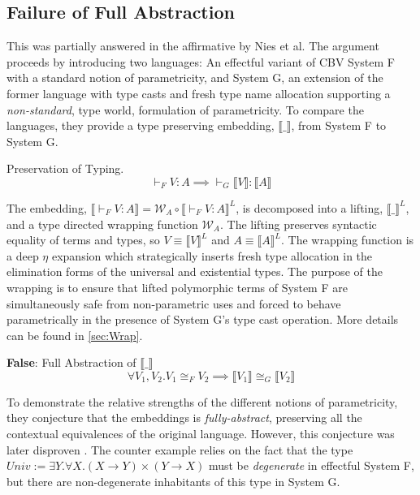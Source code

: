 \documentclass[acmsmall]{acmart}
\newcommand{\den}[1]{\llbracket #1\rrbracket}
\begin{document}
\subsection{Failure of Full Abstraction}
This was partially answered in the affirmative by Nies et al\cite{NonParam}. The argument proceeds by introducing two languages: An effectful variant of CBV System F with a standard notion of parametricity, and System G, an extension of the former language with type casts and fresh type name allocation supporting a \textit{non-standard}, type world, formulation of parametricity.
To compare the languages, they provide a type preserving embedding, $\den{\_}$, from System F to System G. 

\begin{theorem}
  Preservation of Typing.
  $$\vdash_F V : A \implies \vdash_G \den{V} : \den{A}$$
\end{theorem}

The embedding, $\den{\vdash_F V:A} = \mathcal{W}_{A} \circ \den{\vdash_F V:A}^L$, is decomposed into a lifting, $\den{\_}^L$, and a type directed wrapping function $\mathcal{W}_A$. The lifting preserves syntactic equality of terms and types, so $V \equiv \den{V}^L$ and $A \equiv \den{A}^L$. The wrapping function is a deep $\eta$ expansion which strategically inserts fresh type allocation in the elimination forms of the universal and existential types. The purpose of the wrapping is to ensure that lifted polymorphic terms of System F are simultaneously safe from non-parametric uses and forced to behave parametrically in the presence of System G's type cast operation. More details can be found in \cref{sec:Wrap}. 

\begin{conjecture}
  \textbf{False}: Full Abstraction of $\den{\_}$
  $$\forall V_1,V_2. V_1\cong_F V_2 \implies \den{V_1} \cong_G \den{V_2}$$
\end{conjecture}

To demonstrate the relative strengths of the different notions of parametricity, they conjecture that the embeddings is \textit{fully-abstract}, preserving all the contextual equivalences of the original language. However, this conjecture was later disproven\cite{ParamVSUniv} \cite{TwoParamVSThreeUniv}. The counter example relies on the fact that the type $Univ := \exists Y.\forall X. (X\rightarrow Y)\times (Y \rightarrow X)$ must be \textit{degenerate} in effectful System F, but there are non-degenerate inhabitants of this type in System G. 
\end{document}
